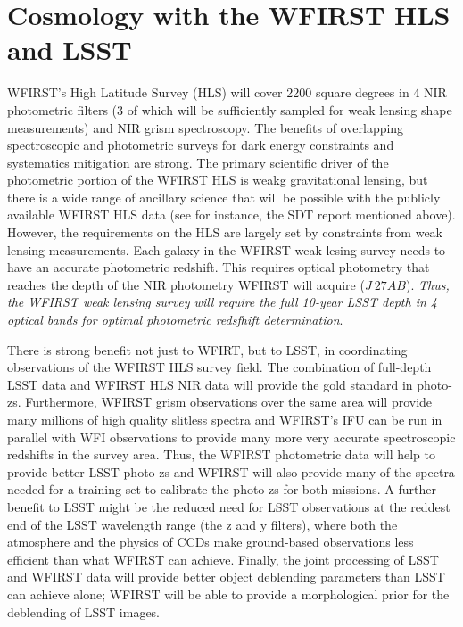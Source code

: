 %
%
%
%

\section{Cosmology with the WFIRST HLS and LSST}
\def\secname{\chpname:weaklensing}\label{sec:\secname}



WFIRST's High Latitude Survey (HLS) will cover
2200 square degrees in 4 NIR photometric filters
(3 of which will be sufficiently sampled for weak lensing shape
measurements) and NIR grism spectroscopy.  The benefits of overlapping
spectroscopic and photometric surveys for dark energy constraints and
systematics mitigation are strong.  The primary scientific driver of the
photometric portion of the WFIRST HLS is weakg gravitational lensing,
but there is a wide range of ancillary science that will be possible
with the publicly available WFIRST HLS data (see for instance, the SDT
report mentioned above).  However, the requirements on the HLS are
largely set by constraints from weak lensing measurements.  Each galaxy
in the WFIRST weak lesing survey needs to have an accurate photometric
redshift.  This requires optical photometry that reaches the depth of
the NIR photometry WFIRST will acquire ($J~27AB$).  \emph{Thus, the
WFIRST weak lensing survey will require the full  10-year LSST depth in
4 optical bands for optimal photometric redsfhift determination}.

There is strong benefit not just to WFIRT, but to LSST, in coordinating
observations of the WFIRST HLS survey field. The combination of
full-depth LSST data and WFIRST HLS NIR data will provide the gold
standard in photo-zs.  Furthermore, WFIRST grism observations over the
same area will provide many millions of high quality slitless spectra
and WFIRST’s IFU can be run in parallel with WFI observations to provide
many more very accurate spectroscopic redshifts in the survey area.
Thus, the WFIRST photometric data will help to provide better LSST
photo-zs and  WFIRST will also provide many of the spectra needed for a
training set to calibrate the photo-zs for both missions.  A further
benefit to LSST might be the reduced need for LSST observations at the
reddest end of the LSST wavelength range (the z and y filters), where
both the atmosphere and the physics of CCDs make ground-based
observations less efficient than what WFIRST can achieve. Finally, the
joint processing of LSST and WFIRST data will provide better object
deblending parameters than LSST can achieve alone; WFIRST will be able
to provide a morphological prior for the deblending of LSST images.

